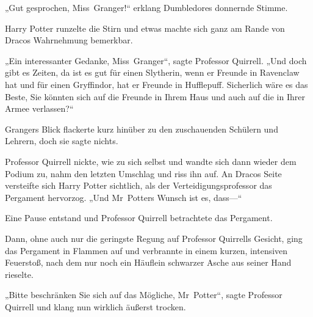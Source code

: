 „Gut gesprochen, Miss~Granger!“ erklang Dumbledores donnernde Stimme.

Harry Potter runzelte die Stirn und etwas machte sich ganz am Rande von Dracos Wahrnehmung bemerkbar.

„Ein interessanter Gedanke, Miss~Granger“, sagte Professor Quirrell. „Und doch gibt es Zeiten, da ist es gut für einen Slytherin, wenn er Freunde in Ravenclaw hat und für einen Gryffindor, hat er Freunde in Hufflepuff. Sicherlich wäre es das Beste, Sie könnten sich auf die Freunde in Ihrem Haus und auch auf die in Ihrer Armee verlassen?“

Grangers Blick flackerte kurz hinüber zu den zuschauenden Schülern und Lehrern, doch sie sagte nichts.

Professor Quirrell nickte, wie zu sich selbst und wandte sich dann wieder dem Podium zu, nahm den letzten Umschlag und riss ihn auf. An Dracos Seite versteifte sich Harry Potter sichtlich, als der Verteidigungsprofessor das Pergament hervorzog. „Und Mr~Potters Wunsch ist es, dass—“

Eine Pause entstand und Professor Quirrell betrachtete das Pergament.

Dann, ohne auch nur die geringste Regung auf Professor Quirrells Gesicht, ging das Pergament in Flammen auf und verbrannte in einem kurzen, intensiven Feuerstoß, nach dem nur noch ein Häuflein schwarzer Asche aus seiner Hand rieselte.

„Bitte beschränken Sie sich auf das Mögliche, Mr~Potter“, sagte Professor Quirrell und klang nun wirklich äußerst trocken.

